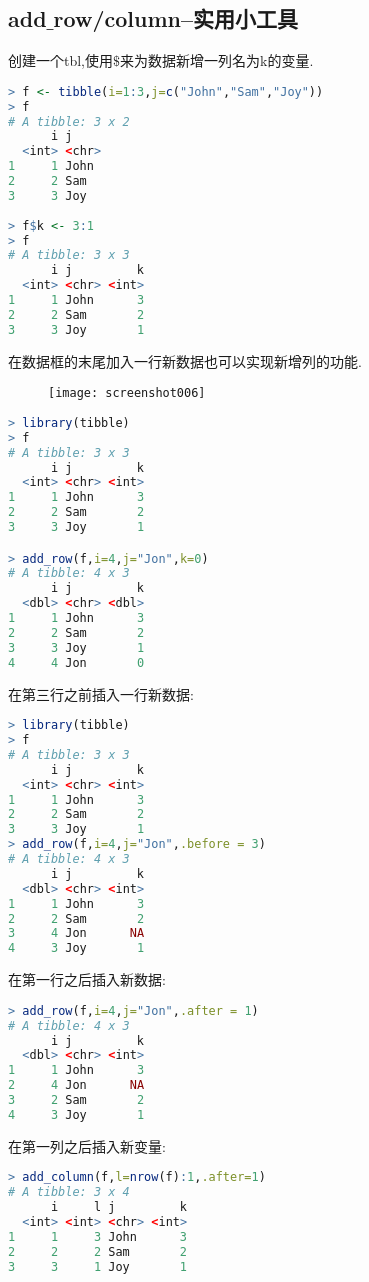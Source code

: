 \documentclass[11pt,a4paper,oneside]{book}
\begin{document}
\subsection{add$ \_ $row/column--实用小工具}
创建一个tbl,使用$ \$ $来为数据新增一列名为k的变量.
\begin{lstlisting}[language=r]
> f <- tibble(i=1:3,j=c("John","Sam","Joy"))
> f
# A tibble: 3 x 2
      i j    
  <int> <chr>
1     1 John 
2     2 Sam  
3     3 Joy 
 
> f$k <- 3:1
> f
# A tibble: 3 x 3
      i j         k
  <int> <chr> <int>
1     1 John      3
2     2 Sam       2
3     3 Joy       1
\end{lstlisting}

在数据框的末尾加入一行新数据也可以实现新增列的功能.
\begin{figure}[H]
	\centering
	\texttt{[image: screenshot006]}
\end{figure}

\begin{lstlisting}[language=r]
> library(tibble)
> f
# A tibble: 3 x 3
      i j         k
  <int> <chr> <int>
1     1 John      3
2     2 Sam       2
3     3 Joy       1

> add_row(f,i=4,j="Jon",k=0)
# A tibble: 4 x 3
      i j         k
  <dbl> <chr> <dbl>
1     1 John      3
2     2 Sam       2
3     3 Joy       1
4     4 Jon       0
\end{lstlisting}

在第三行之前插入一行新数据:
\begin{lstlisting}[language=r]
> library(tibble)
> f
# A tibble: 3 x 3
      i j         k
  <int> <chr> <int>
1     1 John      3
2     2 Sam       2
3     3 Joy       1
> add_row(f,i=4,j="Jon",.before = 3)
# A tibble: 4 x 3
      i j         k
  <dbl> <chr> <int>
1     1 John      3
2     2 Sam       2
3     4 Jon      NA
4     3 Joy       1
\end{lstlisting}

在第一行之后插入新数据:
\begin{lstlisting}[language=r]
> add_row(f,i=4,j="Jon",.after = 1)
# A tibble: 4 x 3
      i j         k
  <dbl> <chr> <int>
1     1 John      3
2     4 Jon      NA
3     2 Sam       2
4     3 Joy       1
\end{lstlisting}

在第一列之后插入新变量:
\begin{lstlisting}[language=r]
> add_column(f,l=nrow(f):1,.after=1)
# A tibble: 3 x 4
      i     l j         k
  <int> <int> <chr> <int>
1     1     3 John      3
2     2     2 Sam       2
3     3     1 Joy       1
\end{lstlisting}
\end{document}
